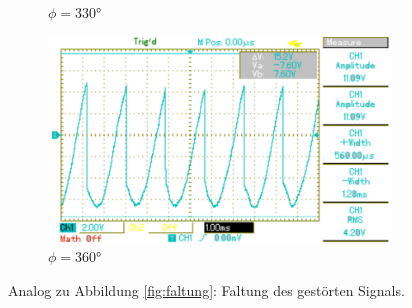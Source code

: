 \begin{figure}[p]
\begin{subfigure}{0.32\textwidth}
		\caption{$\phi=330°$}
	\end{subfigure}
	\begin{subfigure}{0.32\textwidth}
		\includegraphics[width=\textwidth]{Bilder/MAP030.pdf}
		\caption{$\phi=360°$}
	\end{subfigure}
	\caption{Analog zu Abbildung \ref{fig:faltung}: Faltung des gestörten Signals. \cite{gimp}}
	\label{fig:faltungstoerung}
\end{figure}

